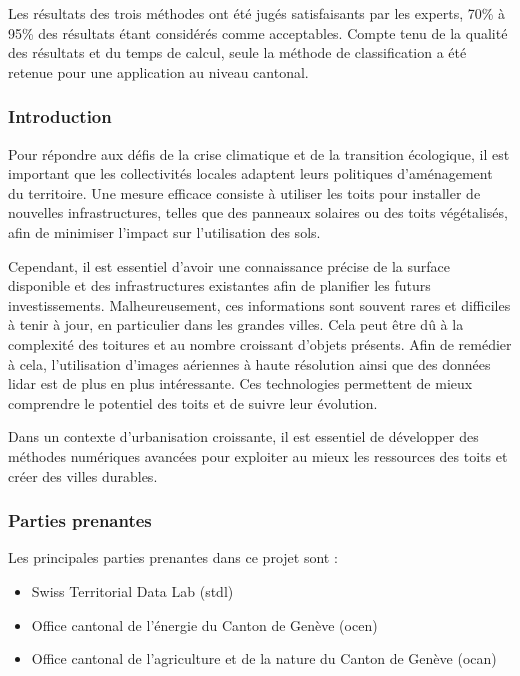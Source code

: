 {\par{Les résultats des trois méthodes ont été jugés satisfaisants par les experts, 70\% à 95\% des résultats étant considérés comme acceptables. Compte tenu de la qualité des résultats et du temps de calcul, seule la méthode de classification a été retenue pour une application au niveau cantonal.}

\subsubsection{Introduction}

\par{Pour répondre aux défis de la crise climatique et de la transition écologique, il est important que les collectivités locales adaptent leurs politiques d'aménagement du territoire. Une mesure efficace consiste à utiliser les toits pour installer de nouvelles infrastructures, telles que des panneaux solaires ou des toits végétalisés, afin de minimiser l'impact sur l'utilisation des sols.}
\par{Cependant, il est essentiel d'avoir une connaissance précise de la surface disponible et des infrastructures existantes afin de planifier les futurs investissements. Malheureusement, ces informations sont souvent rares et difficiles à tenir à jour, en particulier dans les grandes villes. Cela peut être dû à la complexité des toitures et au nombre croissant d'objets présents. Afin de remédier à cela, l'utilisation d'images aériennes à haute résolution ainsi que des données \gls{lidar} est de plus en plus intéressante. Ces technologies permettent de mieux comprendre le potentiel des toits et de suivre leur évolution.}
\par{Dans un contexte d'urbanisation croissante, il est essentiel de développer des méthodes numériques avancées pour exploiter au mieux les ressources des toits et créer des villes durables.}

\subsubsection{Parties prenantes}

\par{Les principales parties prenantes dans ce projet sont :}
\begin{itemize}
\item Swiss Territorial Data Lab (\acrshort{stdl})
\item Office cantonal de l'énergie du Canton de Genève (\acrshort{ocen})
\item Office cantonal de l'agriculture et de la nature du Canton de Genève (\acrshort{ocan})
\end{itemize}

}
